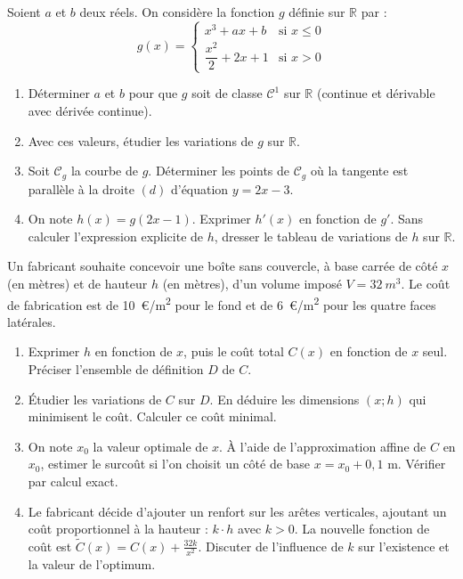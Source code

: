 \documentclass[11pt]{article}
\begin{document}
\begin{exercice}
Soient $a$ et $b$ deux réels. On considère la fonction $g$ définie sur $\mathbb{R}$ par :
\[
g(x) = \begin{cases}
x^3 + ax + b & \text{si } x \leq 0 \\[0.5em]
\dfrac{x^2}{2} + 2x + 1 & \text{si } x > 0
\end{cases}
\]
\begin{enumerate}
    \item Déterminer $a$ et $b$ pour que $g$ soit de classe $\mathcal{C}^1$ sur $\mathbb{R}$ (continue et dérivable avec dérivée continue).
    \item Avec ces valeurs, étudier les variations de $g$ sur $\mathbb{R}$.
    \item Soit $\mathcal{C}_g$ la courbe de $g$. Déterminer les points de $\mathcal{C}_g$ où la tangente est parallèle à la droite $(d)$ d'équation $y = 2x - 3$.
    \item On note $h(x) = g(2x-1)$. Exprimer $h'(x)$ en fonction de $g'$. Sans calculer l'expression explicite de $h$, dresser le tableau de variations de $h$ sur $\mathbb{R}$.
\end{enumerate}
\end{exercice}

\begin{exercice}
Un fabricant souhaite concevoir une boîte sans couvercle, à base carrée de côté $x$ (en mètres) et de hauteur $h$ (en mètres), d'un volume imposé $V = \SI{32}{m^3}$. Le coût de fabrication est de \SI{10}{\euro/m^2} pour le fond et de \SI{6}{\euro/m^2} pour les quatre faces latérales.
\begin{enumerate}
    \item Exprimer $h$ en fonction de $x$, puis le coût total $C(x)$ en fonction de $x$ seul. Préciser l'ensemble de définition $D$ de $C$.
    \item Étudier les variations de $C$ sur $D$. En déduire les dimensions $(x; h)$ qui minimisent le coût. Calculer ce coût minimal.
    \item On note $x_0$ la valeur optimale de $x$. À l'aide de l'approximation affine de $C$ en $x_0$, estimer le surcoût si l'on choisit un côté de base $x = x_0 + 0,1$ m. Vérifier par calcul exact.
    \item Le fabricant décide d'ajouter un renfort sur les arêtes verticales, ajoutant un coût proportionnel à la hauteur : $k \cdot h$ avec $k > 0$. La nouvelle fonction de coût est $\tilde{C}(x) = C(x) + \frac{32k}{x^2}$. Discuter de l'influence de $k$ sur l'existence et la valeur de l'optimum.
\end{enumerate}
\end{exercice}
\end{document}
